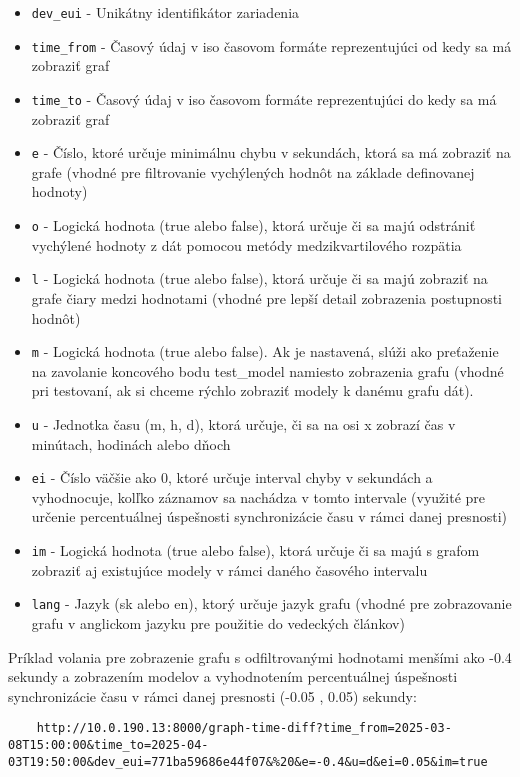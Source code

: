\begin{itemize}
    \item \texttt{dev\_eui} - Unikátny identifikátor zariadenia
    \item \texttt{time\_from} - Časový údaj v iso časovom formáte reprezentujúci od kedy sa má zobraziť graf 
    \item \texttt{time\_to} - Časový údaj v iso časovom formáte reprezentujúci do kedy sa má zobraziť graf
    \item \texttt{e} - Číslo, ktoré určuje minimálnu chybu v sekundách, ktorá sa má zobraziť na grafe (vhodné pre filtrovanie vychýlených hodnôt na základe definovanej hodnoty)
    \item \texttt{o} - Logická hodnota (true alebo false), ktorá určuje či sa majú odstrániť vychýlené hodnoty z dát pomocou metódy medzikvartilového rozpätia
    \item \texttt{l} - Logická hodnota (true alebo false), ktorá určuje či sa majú zobraziť na grafe čiary medzi hodnotami (vhodné pre lepší detail zobrazenia postupnosti hodnôt)
    \item \texttt{m} - Logická hodnota (true alebo false). Ak je nastavená, slúži ako preťaženie na zavolanie koncového bodu test_model namiesto zobrazenia grafu (vhodné pri testovaní, ak si chceme rýchlo zobraziť modely k danému grafu dát).
    \item \texttt{u} - Jednotka času (m, h, d), ktorá určuje, či sa na osi x zobrazí čas v minútach, hodinách alebo dňoch
    \item \texttt{ei} - Číslo väčšie ako 0, ktoré určuje interval chyby v sekundách a vyhodnocuje, kolľko záznamov sa nachádza v tomto intervale (využité pre určenie percentuálnej úspešnosti synchronizácie času v rámci danej presnosti)
    \item \texttt{im} - Logická hodnota (true alebo false), ktorá určuje či sa majú s grafom zobraziť aj existujúce modely v rámci daného časového intervalu
    \item \texttt{lang} - Jazyk (sk alebo en), ktorý určuje jazyk grafu (vhodné pre zobrazovanie grafu v anglickom jazyku pre použitie do vedeckých článkov)
\end{itemize}

Príklad volania pre zobrazenie grafu s odfiltrovanými hodnotami menšími ako -0.4 sekundy a zobrazením modelov a vyhodnotením percentuálnej úspešnosti synchronizácie času v rámci danej presnosti (-0.05 , 0.05) sekundy:

\begin{verbatim}
    http://10.0.190.13:8000/graph-time-diff?time_from=2025-03-08T15:00:00&time_to=2025-04-03T19:50:00&dev_eui=771ba59686e44f07&%20&e=-0.4&u=d&ei=0.05&im=true
\end{verbatim}



